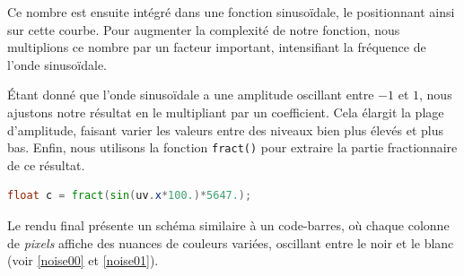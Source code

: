 Ce nombre est ensuite intégré dans une fonction sinusoïdale, le positionnant ainsi sur cette courbe. Pour augmenter la complexité de notre fonction, nous multiplions ce nombre par un facteur important, intensifiant la fréquence de l'onde sinusoïdale.

Étant donné que l'onde sinusoïdale a une amplitude oscillant entre $-1$ et $1$, nous ajustons notre résultat en le multipliant par un coefficient. Cela élargit la plage d'amplitude, faisant varier les valeurs entre des niveaux bien plus élevés et plus bas. Enfin, nous utilisons la fonction \lstinline{fract()} pour extraire la partie fractionnaire de ce résultat.

\begin{minipage}{\linewidth}
\begin{lstlisting}[language=GLSL, caption=Random unidimensionnel,captionpos=b,frame=single]
float c = fract(sin(uv.x*100.)*5647.);
\end{lstlisting}
\end{minipage}

Le rendu final présente un schéma similaire à un code-barres, où chaque colonne de \textit{pixels} affiche des nuances de couleurs variées, oscillant entre le noir et le blanc (voir \ref{noise00} et \ref{noise01}).


